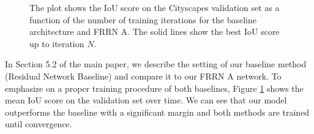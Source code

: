 \documentclass[10pt,twocolumn,letterpaper]{article}
\newcommand{\imsize}{small_}
\begin{document}
\begin{appendix}
\begin{figure}[t]
{} 
	\caption{
		The plot shows the IoU score on the Cityscapes validation set as a function of the number of training iterations for the baseline architecture and FRRN A.
		The solid lines show the best IoU score up to iteration $N$.
	}
	\label{fig:baseline}
\end{figure}
In Section 5.2 of the main paper, we describe the setting of our baseline method (Residual Network Baseline) and compare it to our FRRN A network. 
To emphasize on a proper training procedure of both baselines, Figure \ref{fig:baseline} shows the mean IoU score on the validation set over time. 
We can see that our model outperforms the baseline with a significant margin and both methods are trained until convergence.



\newcommand{\resimlinetwo}[1]{\texttt{[image: images/results/ims/\\imsize\#1]}&
          \texttt{[image: images/results/gt/\\imsize\#1]}&
          \texttt{[image: images/results/ours/\\imsize\#1]}&
          \texttt{[image: images/results/lrr/\\imsize\#1]}\\[-2pt]}


\end{appendix}
\end{document}
